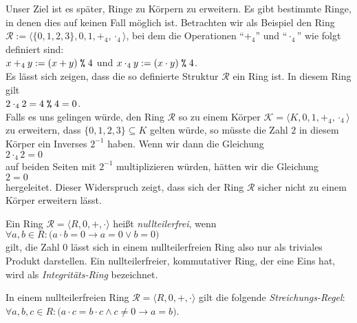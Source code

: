 Unser Ziel ist es später, Ringe zu Körpern zu erweitern.  Es gibt bestimmte Ringe, in
denen dies auf keinen Fall möglich ist.  Betrachten wir als Beispiel den Ring
$\mathcal{R} := \langle \{ 0, 1, 2, 3 \}, 0, 1, +_4, \cdot_4 \rangle$, bei dem die Operationen
``$+_4$'' und ``$\cdot_4$'' wie folgt definiert sind:
\\[0.2cm]
\hspace*{1.3cm}
$x +_4 y := (x + y) \;\texttt{\%}\; 4$ \quad und \quad
$x \cdot_4 y := (x \cdot y) \;\texttt{\%}\; 4$.
\\[0.2cm]
Es lässt sich zeigen, dass die so definierte Struktur $\mathcal{R}$ ein Ring ist.  In
diesem Ring gilt
\\[0.2cm]
\hspace*{1.3cm}
$2 \cdot_4 2 = 4 \;\texttt{\%}\; 4 = 0$.
\\[0.2cm]
Falls es uns gelingen würde, den Ring $\mathcal{R}$ so zu einem Körper 
$\mathcal{K} = \langle K, 0, 1, +_4, \cdot_4 \rangle$ zu erweitern, dass 
$\{0,1,2,3\} \subseteq K$ gelten würde, so müsste die Zahl 
$2$ in diesem Körper ein Inverses $2^{-1}$ haben.  Wenn wir dann die Gleichung
\\[0.2cm]
\hspace*{1.3cm}
$2 \cdot_4 2 = 0$
\\[0.2cm]
auf beiden Seiten mit $2^{-1}$ multiplizieren würden, hätten wir die Gleichung
\\[0.2cm]
\hspace*{1.3cm}
$2 = 0$
\\[0.2cm]
hergeleitet.  Dieser Widerspruch zeigt, dass sich der Ring $\mathcal{R}$ sicher nicht zu
einem Körper erweitern lässt.

\begin{Definition}
  Ein Ring $\mathcal{R} = \langle R, 0, +, \cdot \rangle$ heißt \emph{nullteilerfrei}, wenn
  \\[0.2cm]
  \hspace*{1.3cm}
  $\forall a, b \in R: \bigl(a \cdot b = 0 \rightarrow a = 0 \vee b = 0\bigr)$
  \\[0.2cm]
  gilt, die Zahl $0$ lässt sich in einem nullteilerfreien Ring also nur als triviales Produkt darstellen.
  Ein nullteilerfreier, kommutativer Ring, der eine Eins hat, wird als \emph{Integritäts-Ring}
  bezeichnet.
\eox
\end{Definition}

\remark
In einem nullteilerfreien Ring $\mathcal{R} = \langle R, 0, +, \cdot \rangle$ 
gilt die folgende \emph{Streichungs-Regel}:
\\[0.2cm]
\hspace*{1.3cm}
$\forall a,b,c \in R: \bigl(a \cdot c = b \cdot c \wedge c \not= 0 \rightarrow a = b)$.
\eox

